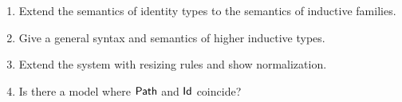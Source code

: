 \begin{enumerate}




\item Extend the semantics of identity types to the semantics of
  inductive families.

\item Give a general syntax and semantics of higher inductive types.

\item Extend the system with resizing rules and show normalization.

\item Is there a model where ${\sf Path}$ and ${\sf Id}$ coincide?

\end{enumerate}

